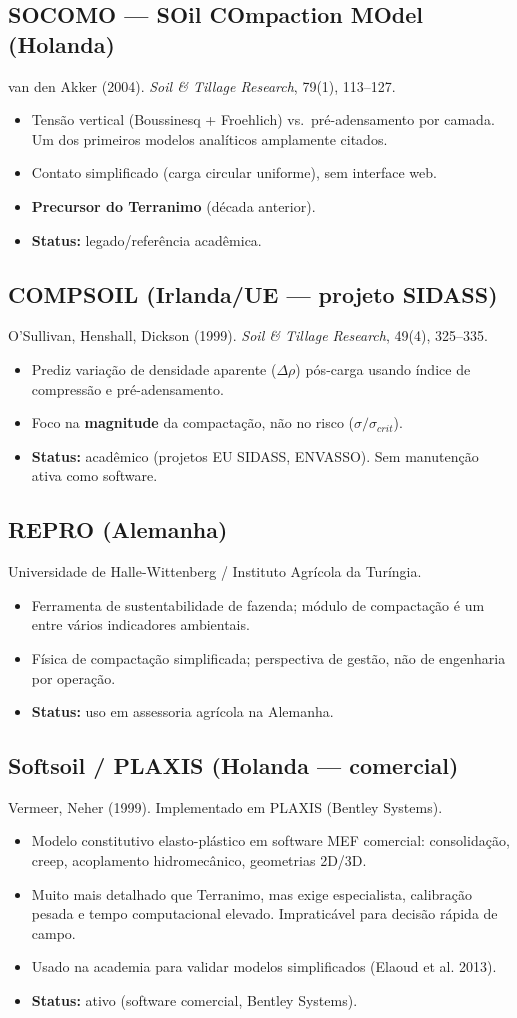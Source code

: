 \documentclass[12pt,a4paper]{article}
\newcommand{\SubsectionKeep}[1]{\needspace{10\baselineskip}\subsection{#1}}
\newenvironment{NoBreakItemize}
{\begin{samepage}\begin{itemize}}
{\end{itemize}\end{samepage}}
\begin{document}
\SubsectionKeep{SOCOMO --- SOil COmpaction MOdel (Holanda)}
van den Akker (2004). \textit{Soil \& Tillage Research}, 79(1), 113--127.

\begin{NoBreakItemize}
  \item Tensão vertical (Boussinesq + Froehlich) vs.\ pré-adensamento por camada. Um dos primeiros modelos analíticos amplamente citados.
  \item Contato simplificado (carga circular uniforme), sem interface web.
  \item \textbf{Precursor do Terranimo} (década anterior).
  \item \textbf{Status:} legado/referência acadêmica.
\end{NoBreakItemize}

\SubsectionKeep{COMPSOIL (Irlanda/UE --- projeto SIDASS)}
O'Sullivan, Henshall, Dickson (1999). \textit{Soil \& Tillage Research}, 49(4), 325--335.

\begin{NoBreakItemize}
  \item Prediz variação de densidade aparente ($\Delta\rho$) pós-carga usando índice de compressão e pré-adensamento.
  \item Foco na \textbf{magnitude} da compactação, não no risco ($\sigma/\sigma_{crit}$).
  \item \textbf{Status:} acadêmico (projetos EU SIDASS, ENVASSO). Sem manutenção ativa como software.
\end{NoBreakItemize}

\SubsectionKeep{REPRO (Alemanha)}
Universidade de Halle-Wittenberg / Instituto Agrícola da Turíngia.

\begin{NoBreakItemize}
  \item Ferramenta de sustentabilidade de fazenda; módulo de compactação é um entre vários indicadores ambientais.
  \item Física de compactação simplificada; perspectiva de gestão, não de engenharia por operação.
  \item \textbf{Status:} uso em assessoria agrícola na Alemanha.
\end{NoBreakItemize}

\SubsectionKeep{Softsoil / PLAXIS (Holanda --- comercial)}
Vermeer, Neher (1999). Implementado em PLAXIS (Bentley Systems).

\begin{NoBreakItemize}
  \item Modelo constitutivo elasto-plástico em software MEF comercial: consolidação, creep, acoplamento hidromecânico, geometrias 2D/3D.
  \item Muito mais detalhado que Terranimo, mas exige especialista, calibração pesada e tempo computacional elevado. Impraticável para decisão rápida de campo.
  \item Usado na academia para validar modelos simplificados (Elaoud et al. 2013).
  \item \textbf{Status:} ativo (software comercial, Bentley Systems).
\end{NoBreakItemize}
\end{document}
